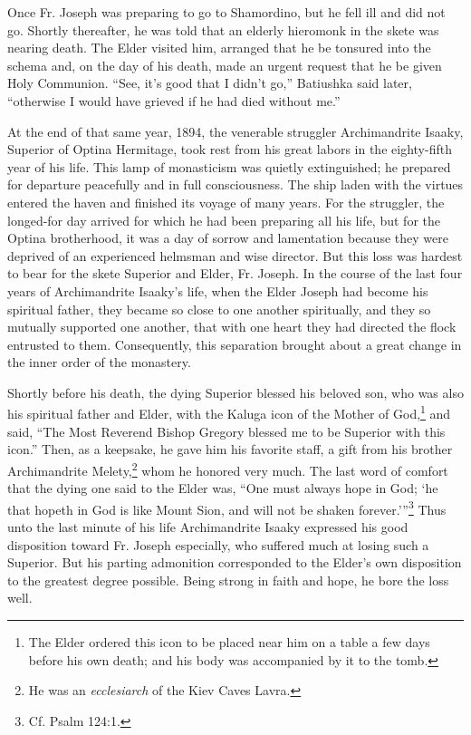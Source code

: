 Once Fr. Joseph was preparing to go to Shamordino, but he fell ill and did not go. Shortly thereafter, he was told that an elderly hieromonk in the skete was nearing death. The Elder visited him, arranged that he be tonsured into the schema and, on the day of his death, made an urgent request that he be given Holy Communion. “See, it's good that I didn't go,” Batiushka said later, “otherwise I would have grieved if he had died without me.”

At the end of that same year, 1894, the venerable struggler Archimandrite Isaaky, Superior of Optina Hermitage, took rest from his great labors in the eighty-fifth year of his life. This lamp of monasticism was quietly extinguished; he prepared for departure peacefully and in full consciousness. The ship laden with the virtues entered the haven and finished its voyage of many years. For the struggler, the longed-for day arrived for which he had been preparing all his life, but for the Optina brotherhood, it was a day of sorrow and lamentation because they were deprived of an experienced helmsman and wise director. But this loss was hardest to bear for the skete Superior and Elder, Fr. Joseph. In the course of the last four years of Archimandrite Isaaky's life, when the Elder Joseph had become his spiritual father, they became so close to one another spiritually, and they so mutually supported one another, that with one heart they had directed the flock entrusted to them. Consequently, this separation brought about a great change in the inner order of the monastery.

Shortly before his death, the dying Superior blessed his beloved son, who was also his spiritual father and Elder, with the Kaluga icon of the Mother of God,\footnote{The Elder ordered this icon to be placed near him on a table a few days before his own death; and his body was accompanied by it to the tomb.} and said, “The Most Reverend Bishop Gregory blessed me to be Superior with this icon.” Then, as a keepsake, he gave him his favorite staff, a gift from his brother Archimandrite Melety,\footnote{He was an \textit{ecclesiarch} of the Kiev Caves Lavra.} whom he honored very much. The last word of comfort that the dying one said to the Elder was, “One must always hope in God; ‘he that hopeth in God is like Mount Sion, and will not be shaken forever.'”\footnote{Cf. Psalm 124:1.} Thus unto the last minute of his life Archimandrite Isaaky expressed his good disposition toward Fr. Joseph especially, who suffered much at losing such a Superior. But his parting admonition corresponded to the Elder's own disposition to the greatest degree possible. Being strong in faith and hope, he bore the loss well.

